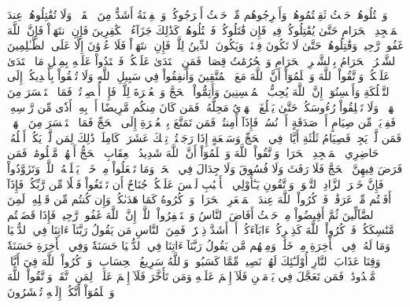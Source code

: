 وَٱقۡتُلُوهُمۡ حَيۡثُ ثَقِفۡتُمُوهُمۡ وَأَخۡرِجُوهُم مِّنۡ حَيۡثُ أَخۡرَجُوكُمۡۚ وَٱلۡفِتۡنَةُ أَشَدُّ مِنَ ٱلۡقَتۡلِۚ وَلَا تُقَٰتِلُوهُمۡ عِندَ ٱلۡمَسۡجِدِ ٱلۡحَرَامِ حَتَّىٰ يُقَٰتِلُوكُمۡ فِيهِۖ فَإِن قَٰتَلُوكُمۡ فَٱقۡتُلُوهُمۡۗ كَذَٰلِكَ جَزَآءُ ٱلۡكَٰفِرِينَ
فَإِنِ ٱنتَهَوۡاْ فَإِنَّ ٱللَّهَ غَفُورٞ رَّحِيمٞ
وَقَٰتِلُوهُمۡ حَتَّىٰ لَا تَكُونَ فِتۡنَةٞ وَيَكُونَ ٱلدِّينُ لِلَّهِۖ فَإِنِ ٱنتَهَوۡاْ فَلَا عُدۡوَٰنَ إِلَّا عَلَى ٱلظَّـٰلِمِينَ
ٱلشَّهۡرُ ٱلۡحَرَامُ بِٱلشَّهۡرِ ٱلۡحَرَامِ وَٱلۡحُرُمَٰتُ قِصَاصٞۚ فَمَنِ ٱعۡتَدَىٰ عَلَيۡكُمۡ فَٱعۡتَدُواْ عَلَيۡهِ بِمِثۡلِ مَا ٱعۡتَدَىٰ عَلَيۡكُمۡۚ وَٱتَّقُواْ ٱللَّهَ وَٱعۡلَمُوٓاْ أَنَّ ٱللَّهَ مَعَ ٱلۡمُتَّقِينَ
وَأَنفِقُواْ فِي سَبِيلِ ٱللَّهِ وَلَا تُلۡقُواْ بِأَيۡدِيكُمۡ إِلَى ٱلتَّهۡلُكَةِ وَأَحۡسِنُوٓاْۚ إِنَّ ٱللَّهَ يُحِبُّ ٱلۡمُحۡسِنِينَ
وَأَتِمُّواْ ٱلۡحَجَّ وَٱلۡعُمۡرَةَ لِلَّهِۚ فَإِنۡ أُحۡصِرۡتُمۡ فَمَا ٱسۡتَيۡسَرَ مِنَ ٱلۡهَدۡيِۖ وَلَا تَحۡلِقُواْ رُءُوسَكُمۡ حَتَّىٰ يَبۡلُغَ ٱلۡهَدۡيُ مَحِلَّهُۥۚ فَمَن كَانَ مِنكُم مَّرِيضًا أَوۡ بِهِۦٓ أَذٗى مِّن رَّأۡسِهِۦ فَفِدۡيَةٞ مِّن صِيَامٍ أَوۡ صَدَقَةٍ أَوۡ نُسُكٖۚ فَإِذَآ أَمِنتُمۡ فَمَن تَمَتَّعَ بِٱلۡعُمۡرَةِ إِلَى ٱلۡحَجِّ فَمَا ٱسۡتَيۡسَرَ مِنَ ٱلۡهَدۡيِۚ فَمَن لَّمۡ يَجِدۡ فَصِيَامُ ثَلَٰثَةِ أَيَّامٖ فِي ٱلۡحَجِّ وَسَبۡعَةٍ إِذَا رَجَعۡتُمۡۗ تِلۡكَ عَشَرَةٞ كَامِلَةٞۗ ذَٰلِكَ لِمَن لَّمۡ يَكُنۡ أَهۡلُهُۥ حَاضِرِي ٱلۡمَسۡجِدِ ٱلۡحَرَامِۚ وَٱتَّقُواْ ٱللَّهَ وَٱعۡلَمُوٓاْ أَنَّ ٱللَّهَ شَدِيدُ ٱلۡعِقَابِ
ٱلۡحَجُّ أَشۡهُرٞ مَّعۡلُومَٰتٞۚ فَمَن فَرَضَ فِيهِنَّ ٱلۡحَجَّ فَلَا رَفَثَ وَلَا فُسُوقَ وَلَا جِدَالَ فِي ٱلۡحَجِّۗ وَمَا تَفۡعَلُواْ مِنۡ خَيۡرٖ يَعۡلَمۡهُ ٱللَّهُۗ وَتَزَوَّدُواْ فَإِنَّ خَيۡرَ ٱلزَّادِ ٱلتَّقۡوَىٰۖ وَٱتَّقُونِ يَـٰٓأُوْلِي ٱلۡأَلۡبَٰبِ
لَيۡسَ عَلَيۡكُمۡ جُنَاحٌ أَن تَبۡتَغُواْ فَضۡلٗا مِّن رَّبِّكُمۡۚ فَإِذَآ أَفَضۡتُم مِّنۡ عَرَفَٰتٖ فَٱذۡكُرُواْ ٱللَّهَ عِندَ ٱلۡمَشۡعَرِ ٱلۡحَرَامِۖ وَٱذۡكُرُوهُ كَمَا هَدَىٰكُمۡ وَإِن كُنتُم مِّن قَبۡلِهِۦ لَمِنَ ٱلضَّآلِّينَ
ثُمَّ أَفِيضُواْ مِنۡ حَيۡثُ أَفَاضَ ٱلنَّاسُ وَٱسۡتَغۡفِرُواْ ٱللَّهَۚ إِنَّ ٱللَّهَ غَفُورٞ رَّحِيمٞ
فَإِذَا قَضَيۡتُم مَّنَٰسِكَكُمۡ فَٱذۡكُرُواْ ٱللَّهَ كَذِكۡرِكُمۡ ءَابَآءَكُمۡ أَوۡ أَشَدَّ ذِكۡرٗاۗ فَمِنَ ٱلنَّاسِ مَن يَقُولُ رَبَّنَآ ءَاتِنَا فِي ٱلدُّنۡيَا وَمَا لَهُۥ فِي ٱلۡأٓخِرَةِ مِنۡ خَلَٰقٖ
وَمِنۡهُم مَّن يَقُولُ رَبَّنَآ ءَاتِنَا فِي ٱلدُّنۡيَا حَسَنَةٗ وَفِي ٱلۡأٓخِرَةِ حَسَنَةٗ وَقِنَا عَذَابَ ٱلنَّارِ
أُوْلَـٰٓئِكَ لَهُمۡ نَصِيبٞ مِّمَّا كَسَبُواْۚ وَٱللَّهُ سَرِيعُ ٱلۡحِسَابِ
۞وَٱذۡكُرُواْ ٱللَّهَ فِيٓ أَيَّامٖ مَّعۡدُودَٰتٖۚ فَمَن تَعَجَّلَ فِي يَوۡمَيۡنِ فَلَآ إِثۡمَ عَلَيۡهِ وَمَن تَأَخَّرَ فَلَآ إِثۡمَ عَلَيۡهِۖ لِمَنِ ٱتَّقَىٰۗ وَٱتَّقُواْ ٱللَّهَ وَٱعۡلَمُوٓاْ أَنَّكُمۡ إِلَيۡهِ تُحۡشَرُونَ
